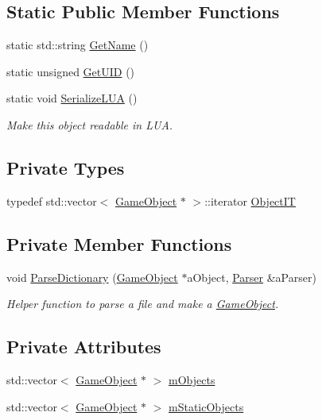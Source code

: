 \subsection*{Static Public Member Functions}
\begin{DoxyCompactItemize}
\item 
static std\+::string \hyperlink{classObjectManager_a7e51aaaa79730b45f8f1da497d4629c0}{Get\+Name} ()
\item 
static unsigned \hyperlink{classObjectManager_a15f1cddde9fe4984332e5c66e92da81b}{Get\+U\+ID} ()
\item 
static void \hyperlink{classObjectManager_acc36c6182462f8f30ddf5aa41ecca31c}{Serialize\+L\+UA} ()
\begin{DoxyCompactList}\small\item\em Make this object readable in L\+UA. \end{DoxyCompactList}\end{DoxyCompactItemize}
\subsection*{Private Types}
\begin{DoxyCompactItemize}
\item 
typedef std\+::vector$<$ \hyperlink{classGameObject}{Game\+Object} $\ast$ $>$\+::iterator \hyperlink{classObjectManager_a30573ab19d87b43fdacf023eeca3098f}{Object\+IT}
\end{DoxyCompactItemize}
\subsection*{Private Member Functions}
\begin{DoxyCompactItemize}
\item 
void \hyperlink{classObjectManager_a9332ecd16f08c4e3d5c406cabcc8a0b5}{Parse\+Dictionary} (\hyperlink{classGameObject}{Game\+Object} $\ast$a\+Object, \hyperlink{classParser}{Parser} \&a\+Parser)
\begin{DoxyCompactList}\small\item\em Helper function to parse a file and make a \hyperlink{classGameObject}{Game\+Object}. \end{DoxyCompactList}\end{DoxyCompactItemize}
\subsection*{Private Attributes}
\begin{DoxyCompactItemize}
\item 
std\+::vector$<$ \hyperlink{classGameObject}{Game\+Object} $\ast$ $>$ \hyperlink{classObjectManager_aa40dab99ba0c0844950a2119b7e57069}{m\+Objects}
\item 
std\+::vector$<$ \hyperlink{classGameObject}{Game\+Object} $\ast$ $>$ \hyperlink{classObjectManager_aa32d62ceac52a5793f92fbc2ea2a62f2}{m\+Static\+Objects}
\end{DoxyCompactItemize}
